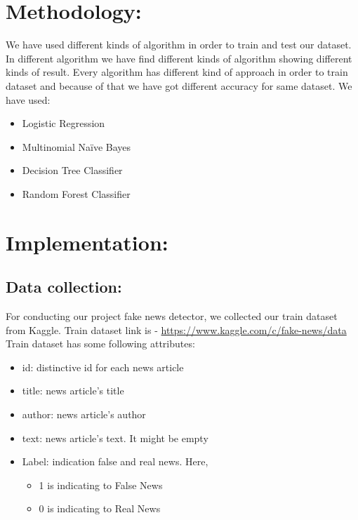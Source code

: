 \documentclass{article}
\begin{document}
    \section{Methodology:}
  We have used different kinds of algorithm in order to train and test our dataset. In different algorithm we have find different kinds of algorithm showing different kinds of result. Every algorithm has different kind of approach in order to train dataset and because of that we have got different accuracy for same dataset. We have used:
\begin{itemize}
    \item Logistic Regression
    \item Multinomial Naïve Bayes
    \item Decision Tree Classifier
    \item Random Forest Classifier
\end{itemize}
   
   \section{Implementation: }
 \subsection{Data collection:}
 For conducting our project fake news detector, we collected our train dataset from Kaggle. Train dataset link is - \url{https://www.kaggle.com/c/fake-news/data}\break
Train dataset has some following attributes:
\begin{itemize}
    \item id: distinctive id for each news article
    \item title: news article’s title
    \item author: news article’s author
    \item text: news article’s text. It might be empty
    \item Label: indication false and real news. Here,
    \begin{itemize}
    \item 1 is indicating to False News
    \item 0 is indicating to Real News
    \end{itemize}
\end{itemize}
\end{document}
